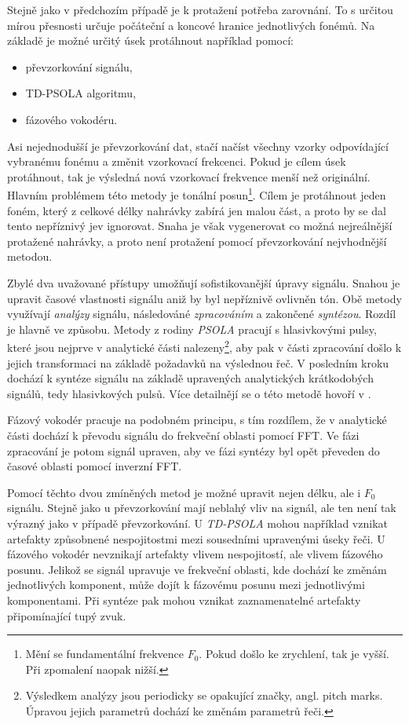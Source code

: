 Stejně jako v předchozím případě je k protažení potřeba zarovnání. To s určitou mírou přesnosti určuje počáteční a koncové hranice jednotlivých fonémů. Na základě je možné určitý úsek protáhnout například pomocí:

\begin{itemize}
  \item převzorkování signálu,
  \item TD-PSOLA algoritmu,
  \item fázového vokodéru.
\end{itemize}

\noindent Asi nejednodušší je převzorkování dat, stačí načíst všechny vzorky odpovídající vybranému fonému a změnit vzorkovací frekcenci. Pokud je cílem úsek protáhnout, tak je výsledná nová vzorkovací frekvence menší než originální. Hlavním problémem této metody je tonální posun\footnote{Mění se fundamentální frekvence $F_0$. Pokud došlo ke zrychlení, tak je vyšší. Při zpomalení naopak nižší.}. Cílem je protáhnout jeden foném, který z celkové délky nahrávky zabírá jen malou část, a proto by se dal tento nepříznivý jev ignorovat. Snaha je však vygenerovat co možná nejreálnější protažené nahrávky, a proto není protažení pomocí převzorkování nejvhodnější metodou.

Zbylé dva uvažované přístupy umožňují sofistikovanější úpravy signálu. Snahou je upravit časové vlastnosti signálu aniž by byl nepříznivě ovlivněn tón.  Obě metody využívají \textit{analýzy} signálu,  následováné \textit{zpracováním} a zakončené \textit{syntézou}. Rozdíl je hlavně ve způsobu. Metody z rodiny \textit{PSOLA} pracují s hlasivkovými pulsy, které jsou nejprve v analytické části nalezeny\footnote{Výsledkem analýzy jsou periodicky se opakující značky, angl. pitch marks. Úpravou jejich parametrů dochází ke změnám parametrů řeči.}, aby pak v části zpracování došlo k jejich transformaci na základě požadavků na výslednou řeč. V posledním kroku dochází k syntéze signálu na základě upravených analytických krátkodobých signálů, tedy hlasivkových pulsů. Více detailnějí se o této metodě hovoří v \cite{Psutka2006}.

Fázový vokodér pracuje na podobném principu, s tím rozdílem, že v analytické části dochází k převodu signálu do frekveční oblasti pomocí FFT. Ve fázi zpracování je potom signál upraven, aby ve fázi syntézy byl opět převeden do časové oblasti pomocí inverzní FFT.

Pomocí těchto dvou zmíněných metod je možné upravit nejen délku, ale i $F_0$ signálu. Stejně jako u převzorkování mají neblahý vliv na signál, ale ten není tak výrazný jako v případě převzorkování. U \textit{TD-PSOLA} mohou například vznikat artefakty způsobnené nespojitostmi mezi sousedními upravenými úseky řeči. U fázového vokodér nevznikají artefakty vlivem nespojitostí, ale vlivem fázového posunu. Jelikož se signál upravuje ve frekveční oblasti, kde dochází ke změnám jednotlivých komponent, může dojít k fázovému posunu mezi jednotlivými komponentami. Při syntéze pak mohou vznikat zaznamenatelné artefakty připomínající tupý zvuk.

